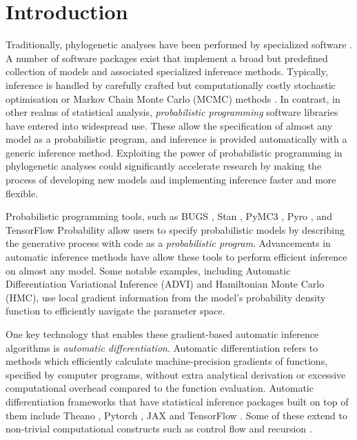 \section{Introduction}

Traditionally, phylogenetic analyses have been performed by specialized software \cite{stamatakis2014raxml, drummond2012bayesian, huelsenbeck2001mrbayes}. A number of software packages exist that implement a broad but predefined collection of models and associated specialized inference methods. Typically, inference is handled by carefully crafted but computationally costly stochastic optimisation or Markov Chain Monte Carlo (MCMC) methods \cite{metropolis1953equation, hastings1970monte}. In contrast, in other realms of statistical analysis, \textit{probabilistic programming} software libraries have entered into widespread use. These allow the specification of almost any model as a probabilistic program, and inference is provided automatically with a generic inference method. Exploiting the power of probabilistic programming in phylogenetic analyses could significantly accelerate research by making the process of developing new models and implementing inference faster and more flexible.

Probabilistic programming tools, such as BUGS \cite{lunn2000winbugs}, Stan \cite{carpenter2017stan}, PyMC3 \cite{salvatier2016probabilistic}, Pyro \cite{bingham2019pyro}, and TensorFlow Probability \cite{dillon2017tensorflow} allow users to specify probabilistic models by describing the generative process with code as a \textit{probabilistic program}. Advancements in automatic inference methods have allow these tools to perform efficient inference on almost any model. Some notable examples, including Automatic Differentiation Variational Inference \cite{kucukelbir2017automatic} (ADVI) and Hamiltonian Monte Carlo \cite{duane1987hybrid} (HMC), use local  gradient information from the model's probability density function to efficiently navigate the parameter space.

One key technology that enables these gradient-based automatic inference algorithms is \textit{automatic differentiation}. Automatic differentiation refers to methods which efficiently calculate machine-precision gradients of functions, specified by computer programs, without extra analytical derivation or excessive computational overhead compared to the function evaluation. Automatic differentiation frameworks that have statistical inference packages built on top of them include Theano \cite{bergstra2010theano}, Pytorch \cite{paszke2019pytorch}, JAX \cite{jax2018github} and TensorFlow \cite{abadi2016tensorflow}. Some of these extend to non-trivial computational constructs such as control flow and recursion \cite{yu2018dynamic}.

